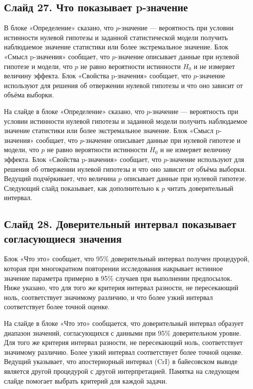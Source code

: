\documentclass[11pt,a4paper]{article}
\begin{document}
\subsection*{Слайд 27. Что показывает p-значение}
\begin{onslide}
В блоке «Определение» сказано, что $p$-значение — вероятность при условии истинности нулевой гипотезы и заданной статистической модели получить наблюдаемое значение статистики или более экстремальное значение. Блок «Смысл p-значения» сообщает, что $p$-значение описывает данные при нулевой гипотезе и модели, что $p$ не равно вероятности истинности $H_0$ и не измеряет величину эффекта. Блок «Свойства p-значения» сообщает, что $p$-значение используют для решения об отвержении нулевой гипотезы и что оно зависит от объёма выборки.
\end{onslide}
На слайде в блоке «Определение» сказано, что $p$-значение — вероятность при условии истинности нулевой гипотезы и заданной модели получить наблюдаемое значение статистики или более экстремальное значение. Блок «Смысл p-значения» сообщает, что $p$-значение описывает данные при нулевой гипотезе и модели, что $p$ не равно вероятности истинности $H_0$ и не измеряет величину эффекта. Блок «Свойства p-значения» сообщает, что $p$-значение используют для решения об отвержении нулевой гипотезы и что оно зависит от объёма выборки. Ведущий подчёркивает, что величина $p$ описывает данные при нулевой гипотезе. Следующий слайд показывает, как дополнительно к $p$ читать доверительный интервал.

\subsection*{Слайд 28. Доверительный интервал показывает согласующиеся значения}
\begin{onslide}
Блок «Что это» сообщает, что 95\% доверительный интервал получен процедурой, которая при многократном повторении исследования накрывает истинное значение параметра примерно в 95\% случаев при выполнении предпосылок. Ниже указано, что для того же критерия интервал разности, не пересекающий ноль, соответствует значимому различию, и что более узкий интервал соответствует более точной оценке.
\end{onslide}
На слайде в блоке «Что это» сообщается, что доверительный интервал образует диапазон значений, согласующихся с данными при 95\% доверительном уровне. Для того же критерия интервал разности, не пересекающий ноль, соответствует значимому различию. Более узкий интервал соответствует более точной оценке. Ведущий указывает, что апостериорный интервал (CrI) в байесовском выводе является другой процедурой с другой интерпретацией. Памятка на следующем слайде помогает выбрать критерий для каждой задачи.
\end{document}
